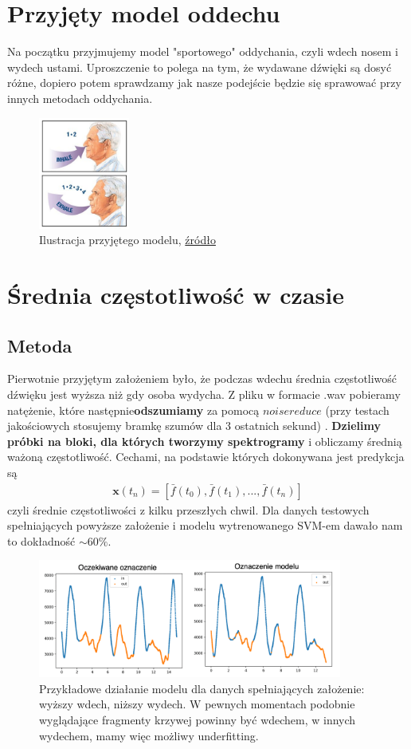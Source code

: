 \documentclass[polish]{article}
\begin{document}
\section{Przyjęty model oddechu}
Na początku przyjmujemy model "sportowego" oddychania, czyli wdech nosem i wydech ustami.
Uproszczenie to polega na tym, że wydawane dźwięki są dosyć różne, dopiero potem sprawdzamy jak nasze podejście będzie się sprawować
przy innych metodach oddychania.
\begin{figure}[H]
	\centering
	\includegraphics[width=3cm]{model_oddechu}
  	\caption{Ilustracja przyjętego modelu,  \href{https://www.quora.com/Should-I-exhale-from-the-mouth-or-nose-while-deep-breathing}{źródło}}
\end{figure}
\section{Średnia częstotliwość w czasie}
\subsection{Metoda}
Pierwotnie przyjętym założeniem było, że podczas wdechu średnia częstotliwość dźwięku jest wyższa niż
gdy osoba wydycha. Z pliku w formacie .wav pobieramy natężenie, które następnie\textbf{odszumiamy} za pomocą $noisereduce$ (przy testach jakościowych stosujemy bramkę szumów dla 3 ostatnich sekund) . 
\textbf{Dzielimy próbki na bloki, dla których tworzymy spektrogramy} i obliczamy
średnią ważoną częstotliwość.
Cechami, na podstawie których dokonywana jest predykcja są  
\begin{gather*}
\boldsymbol x (t_n) = [\bar{f}(t_0), \bar{f}(t_1), ..., \bar{f}(t_n)]
\end{gather*}
czyli średnie częstotliwości z kilku przeszłych chwil.
Dla danych testowych spełniających powyższe założenie i modelu wytrenowanego SVM-em dawało nam to dokładność $\sim 60\%$.
\begin{figure}[H]
	\centering
	\includegraphics[width=10cm]{porownanie_srednie}
	\caption{Przykładowe działanie modelu dla danych spełniających założenie: wyższy wdech, niższy wydech.
	W pewnych momentach podobnie wyglądające fragmenty krzywej powinny być wdechem, w innych wydechem, mamy więc możliwy underfitting.}
\end{figure}
\end{document}
